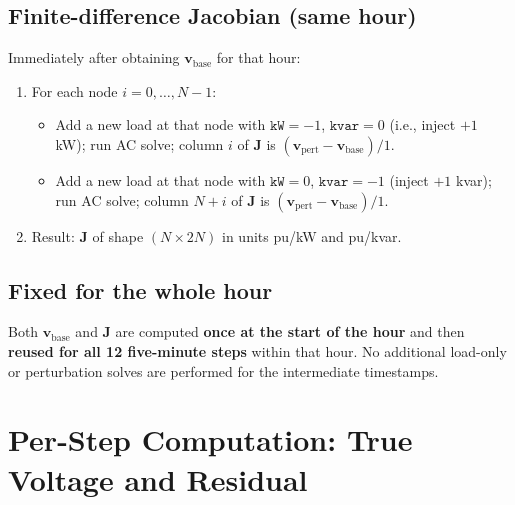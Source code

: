 \documentclass[11pt]{article}
\begin{document}
\subsection{Finite-difference Jacobian (same hour)}

Immediately after obtaining $\mathbf{v}_{\mathrm{base}}$ for that hour:
\begin{enumerate}[noitemsep]
  \item For each node $i = 0, \ldots, N-1$:
  \begin{itemize}[noitemsep]
    \item Add a new load at that node with $\mathtt{kW}=-1$, $\mathtt{kvar}=0$ (i.e., inject $+1$ kW); run AC solve; column $i$ of $\mathbf{J}$ is $(\mathbf{v}_{\mathrm{pert}} - \mathbf{v}_{\mathrm{base}}) / 1$.
    \item Add a new load at that node with $\mathtt{kW}=0$, $\mathtt{kvar}=-1$ (inject $+1$ kvar); run AC solve; column $N+i$ of $\mathbf{J}$ is $(\mathbf{v}_{\mathrm{pert}} - \mathbf{v}_{\mathrm{base}}) / 1$.
  \end{itemize}
  \item Result: $\mathbf{J}$ of shape $(N \times 2N)$ in units pu/kW and pu/kvar.
\end{enumerate}

\subsection{Fixed for the whole hour}

Both $\mathbf{v}_{\mathrm{base}}$ and $\mathbf{J}$ are computed \textbf{once at the start of the hour} and then \textbf{reused for all 12 five-minute steps} within that hour. No additional load-only or perturbation solves are performed for the intermediate timestamps.

\section{Per-Step Computation: True Voltage and Residual}
\end{document}
